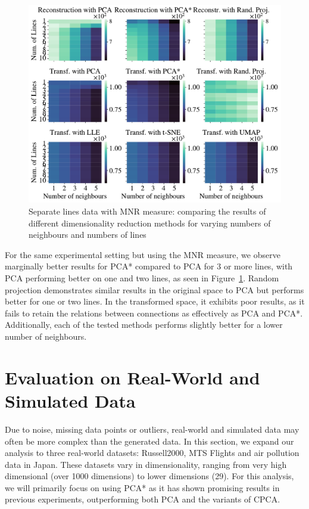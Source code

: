 \documentclass[pdftex,12pt,a4paper]{report}
\begin{document}
\begin{figure}[htb!]
    \includegraphics[width=\textwidth]{./images/multiple_runs/sep_lines/num_lines_vs_num_neigh/multiple_scalar_product/all_methods_10runs_10lines_100points_5neighbours.pdf}
    \caption{Separate lines data with MNR measure: comparing the results of different dimensionality reduction methods for varying numbers of neighbours and numbers of lines}\label{fig:num_neigh_vs_num_lines_seplines_scal}
\end{figure}

For the same experimental setting but using the MNR measure, we observe marginally better results for PCA* compared to PCA for 3 or more lines, with PCA performing better on one and two lines, as seen in Figure~\ref{fig:num_neigh_vs_num_lines_seplines_scal}.
Random projection demonstrates similar results in the original space to PCA but performs better for one or two lines.
In the transformed space, it exhibits poor results, as it fails to retain the relations between connections as effectively as PCA and PCA*. 
Additionally, each of the tested methods performs slightly better for a lower number of neighbours.


\FloatBarrier

\section{Evaluation on Real-World and Simulated Data} \label{real-world-experiments}
Due to noise, missing data points or outliers, real-world and simulated data may often be more complex than the generated data.
In this section, we expand our analysis to three real-world datasets: Russell2000, MTS Flights and air pollution data in Japan.
These datasets vary in dimensionality, ranging from very high dimensional (over 1000 dimensions) to lower dimensions (29).
For this analysis, we will primarily focus on using PCA* as it has shown promising results in previous experiments, outperforming both PCA and the variants of CPCA.  
\end{document}

